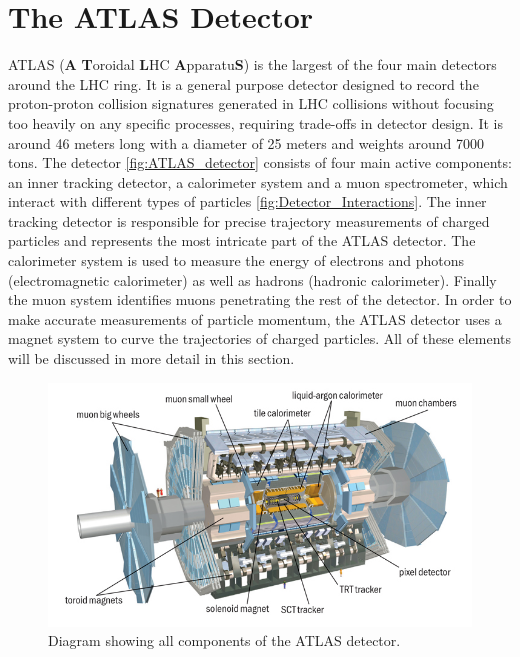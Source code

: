 \section{The ATLAS Detector}

ATLAS (\textbf{A} \textbf{T}oroidal \textbf{L}HC \textbf{A}pparatu\textbf{S}) is the largest of the four main detectors 
around the LHC ring. It is a general purpose detector designed to record the proton-proton collision signatures 
generated in LHC collisions without focusing too heavily on any specific processes, requiring trade-offs in detector 
design. It is around 46 meters long with a diameter of 25 meters and weights around 7000 tons. The detector 
\ref{fig:ATLAS_detector} consists of four main active components: an inner tracking detector, a calorimeter system and 
a muon spectrometer, which interact with different types of particles \ref{fig:Detector_Interactions}. The inner 
tracking detector is responsible for precise trajectory measurements of charged particles and represents the most 
intricate part of the ATLAS detector. The calorimeter system is used to measure the energy of electrons and photons 
(electromagnetic calorimeter) as well as hadrons (hadronic calorimeter). Finally the muon system identifies muons 
penetrating the rest of the detector. In order to make accurate measurements of particle momentum, the ATLAS detector 
uses a magnet system to curve the trajectories of charged particles. All of these elements will be discussed in more 
detail in this section.

\begin{figure}
\centering
    \includegraphics[width=1.0\textwidth]{images/ATLAS_Detector.jpg}
    \caption{Diagram showing all components of the ATLAS detector.}
    \label{fig:ATLAS_Detector}
\end{figure}

